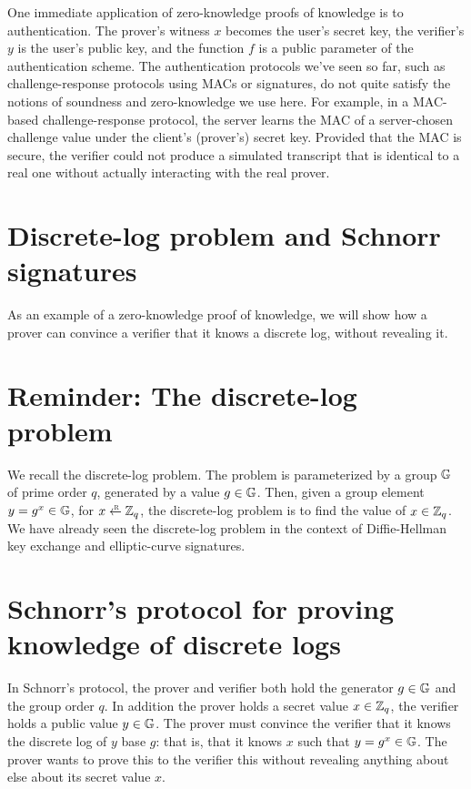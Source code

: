 One immediate application of zero-knowledge proofs of knowledge is to authentication.
The prover's witness $x$ becomes the user's secret key,
the verifier's $y$ is the user's public key, and the
function $f$ is a public parameter of the authentication scheme.
The authentication protocols we've seen so far, such as challenge-response protocols using MACs or signatures,
do not quite satisfy the notions of soundness and zero-knowledge we use here.
For example, in a MAC-based challenge-response protocol, 
the server learns the MAC of a
server-chosen challenge value under the client's (prover's) secret key.
Provided that the MAC is secure, the verifier could not 
produce a simulated transcript that is identical to a
real one without actually interacting with the real prover.

\section{Discrete-log problem and Schnorr signatures}

As an example of a zero-knowledge proof of knowledge, we will show
how a prover can convince a verifier that it knows a discrete
log, without revealing it. 

\section{Reminder: The discrete-log problem}
We recall the discrete-log problem.
The problem is parameterized by 
a group $\mathbb{G}$ of prime order $q$,
generated by a value $g \in \mathbb{G}$.
Then, given a group element $y = g^x \in \mathbb{G}$, for $x \getsr \Z_q$,
the discrete-log problem is to find the value of $x\in \mathbb{Z}_q$.
We have already seen the discrete-log problem in
the context of Diffie-Hellman key exchange and elliptic-curve signatures.


\section{Schnorr's protocol for proving knowledge of discrete logs}

In Schnorr's protocol, the prover and verifier both hold the
generator $g \in \mathbb{G}$ and the group order $q$.
In addition the prover holds a secret value $x \in \mathbb{Z}_q$, the verifier
holds a public value $y \in \mathbb{G}$.
The prover must convince the verifier that it knows the discrete log of $y$
base $g$: that is, that it knows $x$ such that $y=g^x \in \mathbb{G}$.
The prover wants to prove this to the verifier this without revealing
anything about else about its secret value $x$.

